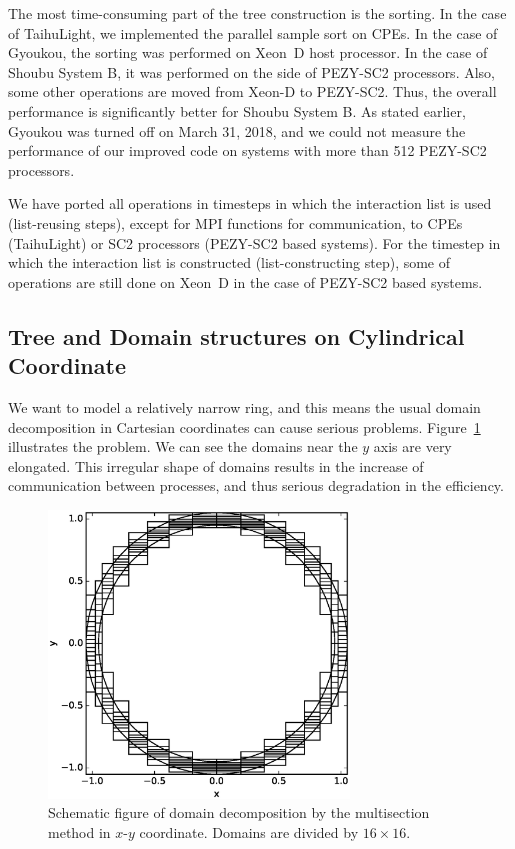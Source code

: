 \documentclass[Afour,sageh,times]{sagej}
\begin{document}
The most time-consuming part of the tree construction is the
sorting. In the case of TaihuLight, we implemented the parallel sample
sort \citep{cmsort} on CPEs. In the case of Gyoukou, the sorting was
performed on Xeon~D host processor. In the case of Shoubu System B, it
was performed on the side of PEZY-SC2 processors. Also, some other
operations are moved from Xeon-D to PEZY-SC2. Thus, the overall
performance is significantly better for Shoubu System B. As stated
earlier, Gyoukou was turned off on March 31, 2018, and we could not
measure the performance of our improved code on systems with more than
512 PEZY-SC2 processors.

We have ported all operations in timesteps in which the interaction
list is used (list-reusing steps), except for MPI functions for
communication, to CPEs (TaihuLight) or SC2 processors (PEZY-SC2 based
systems).  For the timestep in which the interaction list is
constructed (list-constructing step), some of operations are still
done on Xeon~D in the case of PEZY-SC2 based systems.


\subsection{Tree and Domain structures on Cylindrical Coordinate}
\label{subsec:cylcoord}

We want to model a relatively narrow ring, and this means the usual
domain decomposition in Cartesian coordinates can cause serious
problems. Figure~\ref{fig:domain_cart} illustrates the problem. We can
see the domains near the $y$ axis are very elongated. This irregular
shape of domains results in the increase of communication between
processes, and thus serious degradation in the efficiency.

\begin{figure}
  \centering
  \includegraphics[width=8cm,clip]{./fig/domain_cart.eps}
  \caption{Schematic figure of domain decomposition by the multisection
    method in $x$-$y$ coordinate. Domains are divided by $16 \times 16$.}
  \label{fig:domain_cart}
\end{figure}
\end{document}
